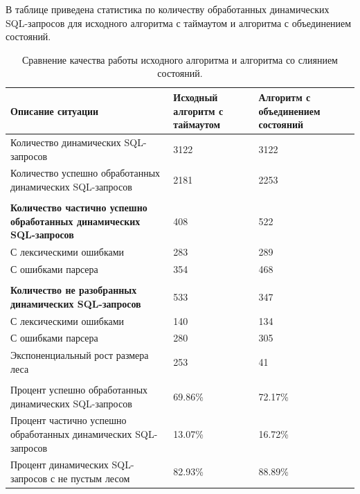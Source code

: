 \documentclass{llncs}
\begin{document}
В таблице приведена статистика по количеству обработанных динамических SQL-запросов для исходного алгоритма с таймаутом и алгоритма с объединением состояний.
\begin{center}
\begin{table}
\caption{Сравнение качества работы исходного алгоритма и алгоритма со слиянием состояний.}
\begin{tabular}[c c c]{| p{5cm} | p{2.5cm} | p{2.5cm} |}
\hline
Описание ситуации & Исходный алгоритм с таймаутом & Алгоритм с объединением состояний
\\
\hline
Количество динамических SQL-запросов & 3122 & 3122
\\
\hline
Количество успешно обработанных динамических SQL-запросов & 2181 & 2253
\\
\hline
 & &
\\
\hline
\bfseries{Количество частично успешно обработанных динамических SQL-запросов} & 408 & 522
\\
\hline

 С лексическими ошибками & 283 & 289
\\
\hline

 С ошибками парсера & 354 & 468
\\
\hline
 & &
\\
\hline

\bfseries{Количество не разобранных динамических SQL-запросов} & 533 & 347
\\
\hline
  С лексическими ошибками & 140 & 134
\\
\hline

 С ошибками парсера & 280 & 305
\\
\hline

 Экспоненциальный рост размера леса & 253 & 41

\\
\hline
 & &
\\
\hline


Процент успешно обработанных динамических SQL-запросов & 69.86\% & 72.17\%
\\
\hline

Процент частично успешно обработанных динамических SQL-запросов & 13.07\% & 16.72\%
\\
\hline

Процент динамических SQL-запросов с не пустым лесом & 82.93\% & 88.89\%
\\
\hline
 
\end{tabular}
\end{table}
\end{center}
\end{document}
